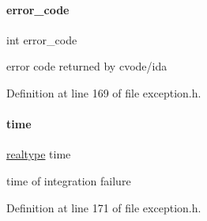 \paragraph{\texorpdfstring{error\+\_\+code}{error\_code}}
{\footnotesize\ttfamily int error\+\_\+code}

error code returned by cvode/ida 

Definition at line 169 of file exception.\+h.

\mbox{\label{classamici_1_1_integration_failure_b_a6dcdb92539544d894bdc153b3ba8bea6}} 
\paragraph{\texorpdfstring{time}{time}}
{\footnotesize\ttfamily \mbox{\hyperlink{namespaceamici_a1bdce28051d6a53868f7ccbf5f2c14a3}{realtype}} time}

time of integration failure 

Definition at line 171 of file exception.\+h.

